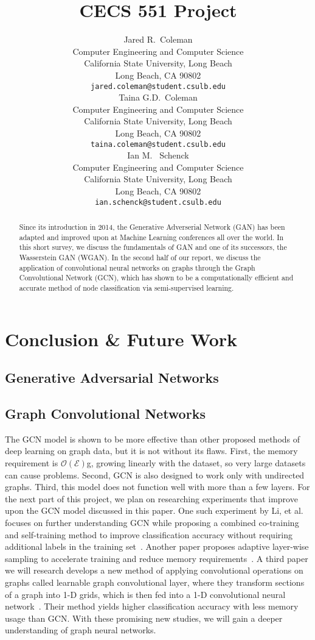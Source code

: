 \documentclass{article}
\title{CECS 551 Project}
\author{%
  Jared R.~Coleman\\
  Computer Engineering and Computer Science\\
  California State University, Long Beach\\
  Long Beach, CA 90802 \\
  \texttt{jared.coleman@student.csulb.edu} \\
  \And 
  Taina G.D.~Coleman\\
  Computer Engineering and Computer Science\\
  California State University, Long Beach\\
  Long Beach, CA 90802 \\
  \texttt{taina.coleman@student.csulb.edu} \\
  \And 
  Ian M. ~Schenck\\
  Computer Engineering and Computer Science\\
  California State University, Long Beach\\
  Long Beach, CA 90802 \\
  \texttt{ian.schenck@student.csulb.edu} \\
}
\begin{document}
\maketitle

\begin{abstract}
   Since its introduction in 2014, the Generative Adverserial Network (GAN) has been adapted and improved upon at Machine Learning conferences all over the world. In this short survey, we discuss the fundamentals of GAN and one of its successors, the Wasserstein GAN (WGAN). In the second half of our report, we discuss the application of convolutional neural networks on graphs through the Graph Convolutional Network (GCN), which has shown to be a computationally efficient and accurate method of node classification via semi-supervised learning.
\end{abstract}






\section{Conclusion \& Future Work}
  \subsection{Generative Adversarial Networks}
  \subsection{Graph Convolutional Networks}
  The GCN model is shown to be more effective than other proposed methods of deep learning on graph data, but it is not without its flaws. First, the memory requirement is $\mathcal{O}(\mathcal{E})$g, growing linearly with the dataset, so very large datasets can cause problems. Second, GCN is also designed to work only with undirected graphs. Third, this model does not function well with more than a few layers.
  For the next part of this project, we plan on researching experiments that improve upon the GCN model discussed in this paper. One such experiment by Li, et al. focuses on further understanding GCN while proposing a combined co-training and self-training method to improve classification accuracy without requiring additional labels in the training set~\cite{Li2018}. Another paper proposes adaptive layer-wise sampling to accelerate training and reduce memory requirements~\cite{Huang2018}. A third paper we will research develops a new method of applying convolutional operations on graphs called learnable graph convolutional layer, where they transform sections of a graph into 1-D grids, which is then fed into a 1-D convolutional neural network~\cite{Gao2018}. Their method yields higher classification accuracy with less memory usage than GCN. With these promising new studies, we will gain a deeper understanding of graph neural networks.
  



\end{document}
